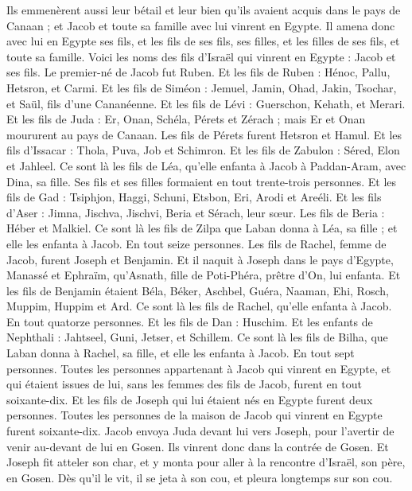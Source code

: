\begin{multicols}{2}
Ils emmenèrent aussi leur bétail et leur bien qu'ils avaient acquis dans le pays de Canaan ; et Jacob et toute sa famille avec lui vinrent en Egypte.
Il amena donc avec lui en Egypte ses fils, et les fils de ses fils, ses filles, et les filles de ses fils, et toute sa famille.
Voici les noms des fils d'Israël qui vinrent en Egypte : Jacob et ses fils. Le premier-né de Jacob fut Ruben.
Et les fils de Ruben : Hénoc, Pallu, Hetsron, et Carmi.
Et les fils de Siméon : Jemuel, Jamin, Ohad, Jakin, Tsochar, et Saül, fils d'une Cananéenne.
Et les fils de Lévi : Guerschon, Kehath, et Merari.
Et les fils de Juda : Er, Onan, Schéla, Pérets et Zérach ; mais Er et Onan moururent au pays de Canaan. Les fils de Pérets furent Hetsron et Hamul.
Et les fils d'Issacar : Thola, Puva, Job et Schimron.
Et les fils de Zabulon : Séred, Elon et Jahleel.
Ce sont là les fils de Léa, qu'elle enfanta à Jacob à Paddan-Aram, avec Dina, sa fille. Ses fils et ses filles formaient en tout trente-trois personnes.
Et les fils de Gad : Tsiphjon, Haggi, Schuni, Etsbon, Eri, Arodi et Areéli.
Et les fils d'Aser : Jimna, Jischva, Jischvi, Beria et Sérach, leur sœur. Les fils de Beria : Héber et Malkiel.
Ce sont là les fils de Zilpa que Laban donna à Léa, sa fille ; et elle les enfanta à Jacob. En tout seize personnes.
Les fils de Rachel, femme de Jacob, furent Joseph et Benjamin.
Et il naquit à Joseph dans le pays d'Egypte, Manassé et Ephraïm, qu'Asnath, fille de Poti-Phéra, prêtre d'On, lui enfanta.
Et les fils de Benjamin étaient Béla, Béker, Aschbel, Guéra, Naaman, Ehi, Rosch, Muppim, Huppim et Ard.
Ce sont là les fils de Rachel, qu'elle enfanta à Jacob. En tout quatorze personnes.
Et les fils de Dan : Huschim.
Et les enfants de Nephthali : Jahtseel, Guni, Jetser, et Schillem.
Ce sont là les fils de Bilha, que Laban donna à Rachel, sa fille, et elle les enfanta à Jacob. En tout sept personnes.
Toutes les personnes appartenant à Jacob qui vinrent en Egypte, et qui étaient issues de lui, sans les femmes des fils de Jacob, furent en tout soixante-dix.
Et les fils de Joseph qui lui étaient nés en Egypte furent deux personnes. Toutes les personnes de la maison de Jacob qui vinrent en Egypte furent soixante-dix.
Jacob envoya Juda devant lui vers Joseph, pour l'avertir de venir au-devant de lui en Gosen. Ils vinrent donc dans la contrée de Gosen.
Et Joseph fit atteler son char, et y monta pour aller à la rencontre d'Israël, son père, en Gosen. Dès qu'il le vit, il se jeta à son cou, et pleura longtemps sur son cou.

\end{multicols}
